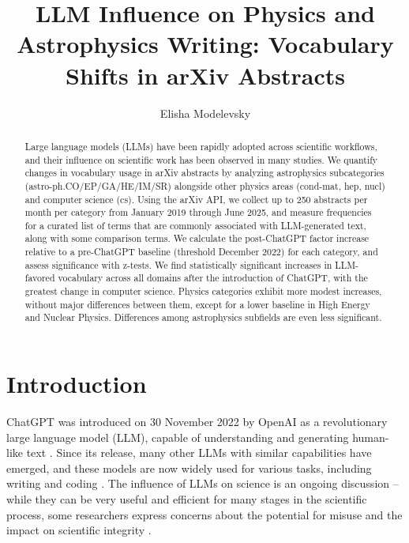 \documentclass[twocolumn]{aastex701}
\begin{document}
\title{LLM Influence on Physics and Astrophysics Writing: Vocabulary Shifts in arXiv Abstracts}

\author[orcid=0000-0003-4105-3443]{Elisha Modelevsky}

\begin{abstract}

Large language models (LLMs) have been rapidly adopted across scientific workflows, and their influence on scientific work has been observed in many studies.
We quantify changes in vocabulary usage in arXiv abstracts by analyzing astrophysics subcategories (astro-ph.CO/EP/GA/HE/IM/SR) alongside other physics areas (cond-mat, hep, nucl) and computer science (cs).
Using the arXiv API, we collect up to 250 abstracts per month per category from January 2019 through June 2025, and measure frequencies for a curated list of terms that are commonly associated with LLM-generated text, along with some comparison terms.
We calculate the post-ChatGPT factor increase relative to a pre-ChatGPT baseline (threshold December 2022) for each category, and assess significance with z-tests.
We find statistically significant increases in LLM-favored vocabulary across all domains after the introduction of ChatGPT, with the greatest change in computer science.
Physics categories exhibit more modest increases, without major differences between them, except for a lower baseline in High Energy and Nuclear Physics.
Differences among astrophysics subfields are even less significant.


\end{abstract}


\section{Introduction} 

ChatGPT was introduced on 30 November 2022 by OpenAI as a revolutionary large language model (LLM), capable of understanding and generating human-like text \citep{Roumeliotis2023}.
Since its release, many other LLMs with similar capabilities have emerged, and these models are now widely used for various tasks, including writing and coding \citep{Minaee2024}.
The influence of LLMs on science is an ongoing discussion -- while they can be very useful and efficient for many stages in the scientific process, some researchers express concerns about the potential for misuse and the impact on scientific integrity \citep{Zhang2025}.
\end{document}
